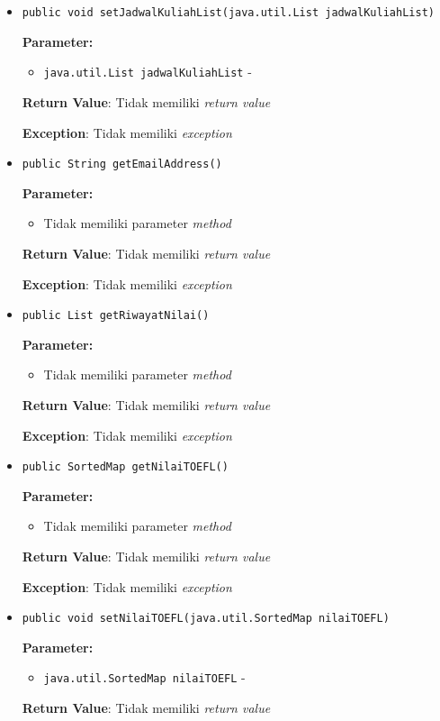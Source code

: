 \documentclass{article}
\begin{document}
\begin{enumerate}
\begin{itemize}
\item \texttt{public void setJadwalKuliahList(java.util.List jadwalKuliahList)}

\textbf{Parameter:}
\begin{itemize}
\item \texttt{java.util.List jadwalKuliahList} - 
\end{itemize}
\textbf{Return Value}: Tidak memiliki \textit{return value}

\textbf{Exception}: Tidak memiliki \textit{exception}

\item \texttt{public String getEmailAddress()}

\textbf{Parameter:}
\begin{itemize}
\item Tidak memiliki parameter \textit{method}
\end{itemize}
\textbf{Return Value}: Tidak memiliki \textit{return value}

\textbf{Exception}: Tidak memiliki \textit{exception}

\item \texttt{public List getRiwayatNilai()}

\textbf{Parameter:}
\begin{itemize}
\item Tidak memiliki parameter \textit{method}
\end{itemize}
\textbf{Return Value}: Tidak memiliki \textit{return value}

\textbf{Exception}: Tidak memiliki \textit{exception}

\item \texttt{public SortedMap getNilaiTOEFL()}

\textbf{Parameter:}
\begin{itemize}
\item Tidak memiliki parameter \textit{method}
\end{itemize}
\textbf{Return Value}: Tidak memiliki \textit{return value}

\textbf{Exception}: Tidak memiliki \textit{exception}

\item \texttt{public void setNilaiTOEFL(java.util.SortedMap nilaiTOEFL)}

\textbf{Parameter:}
\begin{itemize}
\item \texttt{java.util.SortedMap nilaiTOEFL} - 
\end{itemize}
\textbf{Return Value}: Tidak memiliki \textit{return value}


\end{itemize}
\end{enumerate}
\end{document}
